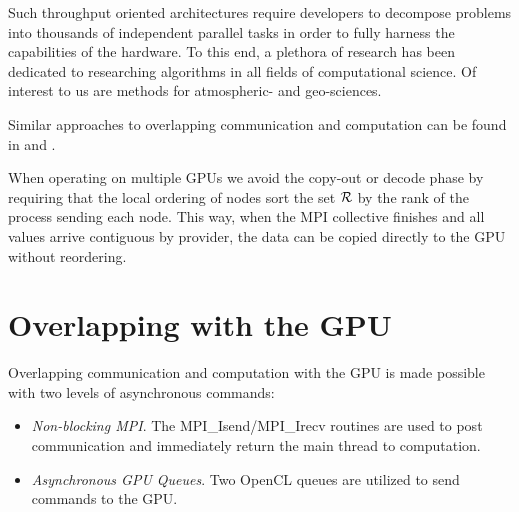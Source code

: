 \documentclass{report}
\begin{document}
Such throughput oriented architectures require developers to decompose problems into thousands of independent parallel tasks in order to fully harness the capabilities of the hardware. To this end, a plethora of research has been dedicated to researching algorithms in all fields of computational science. Of interest to us are methods for atmospheric- and geo-sciences. 


Similar approaches to overlapping communication and computation can be found in \cite{Schubert2011} and \cite{Thibault2009}.

When operating on multiple GPUs we avoid the copy-out or decode phase by requiring that the local ordering of nodes sort the set $\mathcal{R}$ by the rank of the process sending each node. This way, when the MPI collective finishes and all values arrive contiguous by provider, the data can be copied directly to the GPU without reordering.

\section{Overlapping with the GPU}

Overlapping communication and computation with the GPU is made possible with two levels of asynchronous commands: 
\begin{itemize} 
\item \emph{Non-blocking MPI}. The MPI\_Isend/MPI\_Irecv routines are used to post communication and immediately return the main thread to computation. 
\item \emph{Asynchronous GPU Queues}. Two OpenCL queues are utilized to send commands to the GPU. 
\end{itemize}
\end{document}
